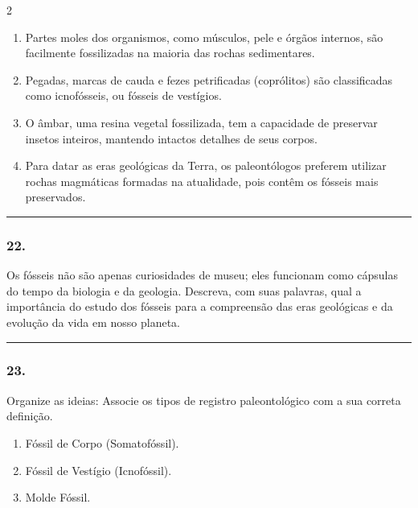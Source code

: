 \documentclass[twoside, 10pt, a4paper]{article}
\newlength{\espacoPreQuestao}
\newlength{\espacoQuestao}
\newlength{\espacoAlt}
\begin{document}
\begin{multicols*}{2}
\begin{enumerate}[label=(\ \ ), itemsep=\espacoAlt]
\item Partes moles dos organismos, como músculos, pele e órgãos internos, são facilmente fossilizadas na maioria das rochas sedimentares.
\item Pegadas, marcas de cauda e fezes petrificadas (coprólitos) são classificadas como icnofósseis, ou fósseis de vestígios.
\item O âmbar, uma resina vegetal fossilizada, tem a capacidade de preservar insetos inteiros, mantendo intactos detalhes de seus corpos.
\item Para datar as eras geológicas da Terra, os paleontólogos preferem utilizar rochas magmáticas formadas na atualidade, pois contêm os fósseis mais preservados.
\end{enumerate}
\par\vspace{\espacoQuestao}

\noindent\textcolor{CorLinha}{\rule{\linewidth}{0.5pt}} 
\par\vspace{\espacoPreQuestao}
\subsubsection*{22.} Os fósseis não são apenas curiosidades de museu; eles funcionam como cápsulas do tempo da biologia e da geologia. Descreva, com suas palavras, qual a importância do estudo dos fósseis para a compreensão das eras geológicas e da evolução da vida em nosso planeta.
\par\vspace{\espacoQuestao}

\noindent\textcolor{CorLinha}{\rule{\linewidth}{0.5pt}} 
\par\vspace{\espacoPreQuestao}
\subsubsection*{23.} Organize as ideias: Associe os tipos de registro paleontológico com a sua correta definição.

\begin{enumerate}[label=\Roman*., itemsep=\espacoAlt]
\item Fóssil de Corpo (Somatofóssil).
\item Fóssil de Vestígio (Icnofóssil).
\item Molde Fóssil.
\end{enumerate}


\end{multicols*}
\end{document}
